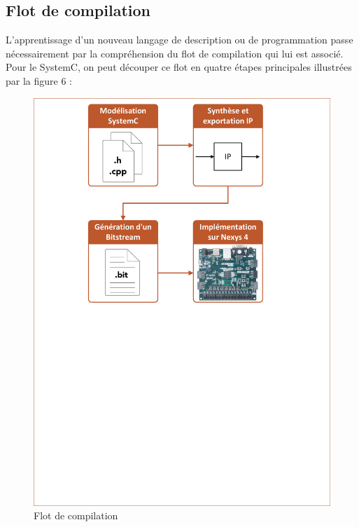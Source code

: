 \documentclass[a4paper,12pt]{article}
\begin{document}
\subsection{Flot de compilation}
L'apprentissage d'un nouveau langage de description ou de programmation passe nécessairement par la compréhension du flot de compilation qui lui est associé. Pour le SystemC, on peut découper ce flot en quatre étapes principales illustrées par la figure 6 :
\begin{figure}[H]
\centering
\includegraphics[scale=0.5, keepaspectratio]{Dessin2.pdf}
\caption{Flot de compilation}
\end{figure}
\end{document}
